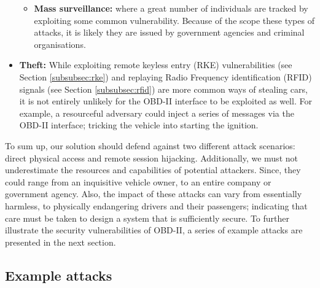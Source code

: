 \begin{itemize}
\begin{itemize}
		\item \textbf{Mass surveillance:} where a great number of individuals are tracked by exploiting some common vulnerability. Because of the scope these types of attacks, it is likely they are issued by government agencies and criminal organisations.
	\end{itemize}
	
	
	\item \textbf{Theft:} While exploiting remote keyless entry (RKE) vulnerabilities (see Section \ref{subsubsec:rke}) and replaying Radio Frequency identification (RFID) signals (see Section \ref{subsubsec:rfid}) are more common ways of stealing cars, it is not entirely unlikely for the OBD-II interface to be exploited as well. For example, a resourceful adversary could inject a series of messages via the OBD-II interface; tricking the vehicle into starting the ignition.	
\end{itemize}
To sum up, our solution should defend against two different attack scenarios: direct physical access and remote session hijacking. Additionally, we must not underestimate the resources and capabilities of potential attackers. Since, they could range from an inquisitive vehicle owner, to an entire company or government agency. Also, the impact of these attacks can vary from essentially harmless, to physically endangering drivers and their passengers; indicating that care must be taken to design a system that is sufficiently secure. To further illustrate the security vulnerabilities of OBD-II, a series of example attacks are presented in the next section.

\subsection{Example attacks}
\label{subsec:example_attacks}

